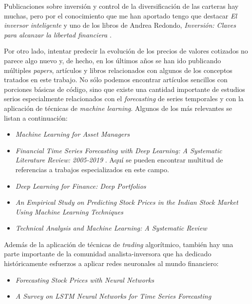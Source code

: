 
Publicaciones sobre inversión y control de la diversificación de las carteras hay muchas, pero por el conocimiento que me han aportado tengo que destacar \emph{El inversor inteligente} \citep{book:Inversor_inteligente} y uno de los libros de Andrea Redondo, \emph{Inversión: Claves para alcanzar la libertad financiera} \citep{book:libertad_financiera}.

Por otro lado, intentar predecir la evolución de los precios de valores cotizados no parece algo nuevo y, de hecho, en los últimos años se han ido publicando múltiples \emph{papers}, artículos y libros relacionados con algunos de los conceptos tratados en este trabajo. No sólo podemos encontrar artículos sencillos con porciones básicas de código, sino que existe una cantidad importante de estudios serios especialmente relacionados con el \emph{forecasting} de series temporales y con la aplicación de técnicas de \emph{machine learning}. Algunos de los más relevantes se listan a continuación:

\begin{itemize}
\tightlist
\item \emph{Machine Learning for Asset Managers} \citep{paper:ML_Asset_Managers}
\item \emph{Financial Time Series Forecasting with Deep Learning: A Systematic Literature Review: 2005-2019} \citep{paper:Deep_Learning_Review}. Aquí se pueden encontrar multitud de referencias a trabajos especializados en este campo. 
\item \emph{Deep Learning for Finance: Deep Portfolios} \citep{paper:Deep_Portfolios}
\item \emph{An Empirical Study on Predicting Stock Prices in the Indian Stock Market Using Machine Learning Techniques} \citep{paper:Empirical_Stock_India}
\item \emph{Technical Analysis and Machine Learning: A Systematic Review} \citep{paper:Technical_Analysis_ML}
\end{itemize}

Además de la aplicación de técnicas de \emph{trading} algorítmico, también hay una parte importante de la comunidad analista-inversora que ha dedicado históricamente esfuerzos a aplicar redes neuronales al mundo financiero:

\begin{itemize}
\tightlist
\item \emph{Forecasting Stock Prices with Neural Networks} \citep{paper:Forecasting_NN}
\item \emph{A Survey on LSTM Neural Networks for Time Series Forecasting} \citep{paper:LSTM_Survey}
\end{itemize}

